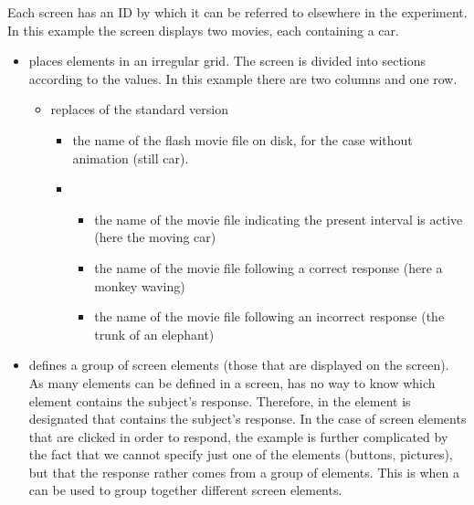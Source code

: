  Each screen has an ID by which it can be referred
to elsewhere in the experiment. In this example the screen
displays two movies, each containing a car.

\begin{itemize}
\item {} places elements in an irregular grid.
The screen is divided into sections according to the values. In
this example there are two columns and one row.

\begin{itemize}
\item {} replaces  of the standard
version

\begin{itemize}
\item {} the name of the flash movie file on disk,
for the case without animation (still car).

\item {}

\begin{itemize}


\item {} the name of the movie file indicating the present interval is active (here the moving car)

\item {} the name of the movie file following a
correct response (here a monkey waving)

\item {} the name of the movie file following an
incorrect response  (the trunk of an elephant)
\end{itemize}
\end{itemize}

\end{itemize}

\item {} defines a group of screen elements
(those that are displayed on the screen). As many elements can be
defined in a screen, \apex has no way to know which element
contains the subject's response. Therefore, in
 the element is designated that
contains the subject's response. In the case of screen elements
that are clicked in order to respond, the example is further
complicated by the fact that we cannot specify just one of the
elements (buttons, pictures), but that the response rather comes
from a group of elements. This is when a  can
be used to group together different screen elements. 


\end{itemize}

